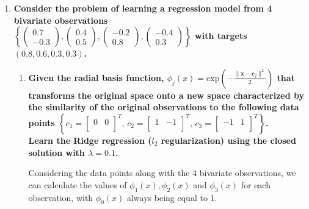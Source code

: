 \documentclass[12pt]{article}
\begin{document}
\begin{enumerate}[leftmargin=\labelsep]
  \item \textbf{Consider the problem of learning a regression model from 4 bivariate observations} \\

        \vskip -0.2cm
        \textbf{$\left\{\begin{pmatrix} 0.7 \\ -0.3 \end{pmatrix}, \begin{pmatrix} 0.4 \\ 0.5 \end{pmatrix}, \begin{pmatrix} -0.2 \\ 0.8 \end{pmatrix},
            \begin{pmatrix} -0.4 \\ 0.3 \end{pmatrix}\right\}$ with targets $(0.8, 0.6, 0.3, 0.3)$.}

        \begin{enumerate}
          \item \textbf{Given the radial basis function, $\phi_j(x) = \text{exp}\left({ -\frac{\| \mathbf{x} - \boldsymbol{c}_j \|^2}{2} }\right)$ that transforms
                  the original space onto a new space characterized by the similarity of the original observations to the following data points
                  $\left\{ c_1 = \begin{bmatrix} 0 & 0 \\ \end{bmatrix}^T,\, c_2 = \begin{bmatrix} 1 & -1 \\ \end{bmatrix}^T,\, c_3 = \begin{bmatrix} -1 & 1 \\ \end{bmatrix}^T\right\}$. \\
                  Learn the Ridge regression ($l_2$ regularization) using the closed solution with $\lambda = 0.1$.}

                \vskip 0.3cm
                Considering the data points along with the 4 bivariate observations, we can calculate the values of $\phi_1(x), \phi_2(x)$
                and $\phi_3(x)$ for each observation, with $\phi_0(x)$ always being equal to 1.


\end{enumerate}
\end{enumerate}
\end{document}

